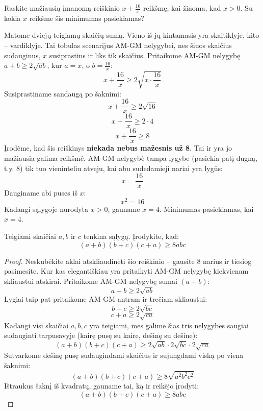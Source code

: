 \documentclass[11pt,a4paper]{scrartcl}
\begin{document}
\begin{example}
Raskite mažiausią įmanomą reiškinio $x + \frac{16}{x}$ reikšmę, kai žinoma, kad $x > 0$. Su kokia $x$ reikšme šis minimumas pasiekiamas?
\end{example}
\begin{solution}

Matome dviejų teigiamų skaičių sumą. Vieno iš jų kintamasis yra skaitiklyje, kito – vardiklyje. Tai tobulas scenarijus AM-GM nelygybei, nes šiuos skaičius sudauginus, $x$ susiprastins ir liks tik skaičius. Pritaikome AM-GM nelygybę $a + b \ge 2\sqrt{ab}$, kur $a = x$, o $b = \frac{16}{x}$:
$$ x + \frac{16}{x} \ge 2\sqrt{x \cdot \frac{16}{x}} $$
Susiprastiname sandaugą po šaknimi:
$$ x + \frac{16}{x} \ge 2\sqrt{16} $$
$$ x + \frac{16}{x} \ge 2 \cdot 4 $$
$$ x + \frac{16}{x} \ge 8 $$
Įrodėme, kad šis reiškinys \textbf{niekada nebus mažesnis už 8}. Tai ir yra jo mažiausia galima reikšmė.
AM-GM nelygybė tampa lygybe (pasiekia patį dugną, t.y. 8) tik tuo vieninteliu atveju, kai abu sudedamieji nariai yra lygūs:
$$ x = \frac{16}{x} $$
Dauginame abi puses iš $x$:
$$ x^2 = 16 $$
Kadangi sąlygoje nurodyta $x > 0$, gauname $x = 4$. Minimumas pasiekiamas, kai $x = 4$.\\
\end{solution}

\begin{example}
Teigiami skaičiai $a, b$ ir $c$ tenkina sąlygą. Įrodykite, kad:
$$ (a+b)(b+c)(c+a) \ge 8abc $$
\end{example}
\begin{proof}
Neskubėkite aklai atskliaudinėti šio reiškinio – gausite 8 narius ir tiesiog pasimesite. Kur kas elegantiškiau yra pritaikyti AM-GM nelygybę kiekvienam skliaustui atskirai.
Pritaikome AM-GM nelygybę sumai $(a+b)$:
$$ a+b \ge 2\sqrt{ab} $$
Lygiai taip pat pritaikome AM-GM antram ir trečiam skliaustui:
$$ b+c \ge 2\sqrt{bc} $$
$$ c+a \ge 2\sqrt{ca} $$
Kadangi visi skaičiai $a, b, c$ yra teigiami, mes galime šias tris nelygybes saugiai sudauginti tarpusavyje (kairę pusę su kaire, dešinę su dešine):
$$ (a+b)(b+c)(c+a) \ge 2\sqrt{ab} \cdot 2\sqrt{bc} \cdot 2\sqrt{ca} $$
Sutvarkome dešinę pusę sudaugindami skaičius ir sujungdami viską po viena šaknimi:
$$ (a+b)(b+c)(c+a) \ge 8\sqrt{a^2b^2c^2} $$
Ištraukus šaknį iš kvadratų, gauname tai, ką ir reikėjo įrodyti:
$$ (a+b)(b+c)(c+a) \ge 8abc $$
\end{proof}
\end{document}
